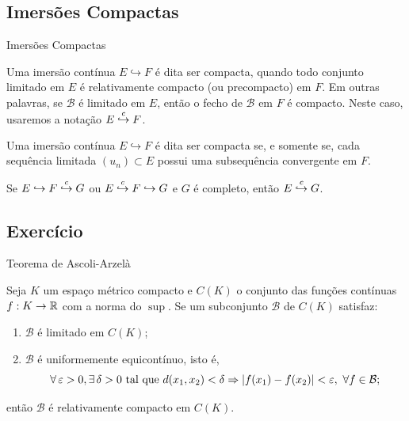 \subsection*{Imersões Compactas}
\begin{frame}{Imersões Compactas}
\begin{defin}
Uma imersão contínua \(E\hookrightarrow F\) é dita ser {\color{blue}compacta}, quando
todo conjunto limitado em \(E\) é {\color{blue}relativamente compacto (ou precompacto)} em \(F\). Em outras palavras, se \(\mathcal{B}\) é limitado em \(E\), então o fecho de \(\mathcal{B}\) em \(F\) é compacto.  Neste caso, usaremos a notação \(E\stackrel{c}{\hookrightarrow} F\).
\end{defin}

\begin{prop}
Uma imersão contínua \(E\hookrightarrow F\) é dita ser {\color{blue}compacta} se, e somente se,  cada sequência limitada \((u_n)\subset E\) possui uma subsequência convergente  em \(F\). 
\end{prop}

\begin{exer}
Se \(E\hookrightarrow F \stackrel{c}{\hookrightarrow} G\) ou  \(E\stackrel{c}{\hookrightarrow} F \hookrightarrow G\) e \(G\) é completo, então \(E\stackrel{c}{\hookrightarrow} G\).
\end{exer}
\subsection*{Exercício \theexer}
\end{frame}


\begin{frame}{Teorema de Ascoli-Arzelà}

\begin{teo}
Seja \(K\) um {\color{blue}espaço métrico compacto} e \(C(K)\) o conjunto das funções contínuas \(f:K\to \mathbb{R}\) com a norma do \(\sup\). Se um subconjunto \(\mathcal{B}\) de   \(C(K)\)  satisfaz:
\begin{enumerate}
\item \(\mathcal{B}\) é {\color{blue}limitado} em \(C(K)\);
\item \(\mathcal{B}\) é {\color{blue}uniformemente equicontínuo}, isto é, 
\[\forall\, \ep>0, \exists\, \delta>0 \text{ tal que } d(x_1,x_2)<\delta \Rightarrow |f(x_1)-f(x_2)|<\ep,\ \forall f\in \mathcal{B};\]
\end{enumerate}
então \(\mathcal{B}\) é {\color{red}relativamente compacto} em \(C(K)\).
\end{teo}
\end{frame}

